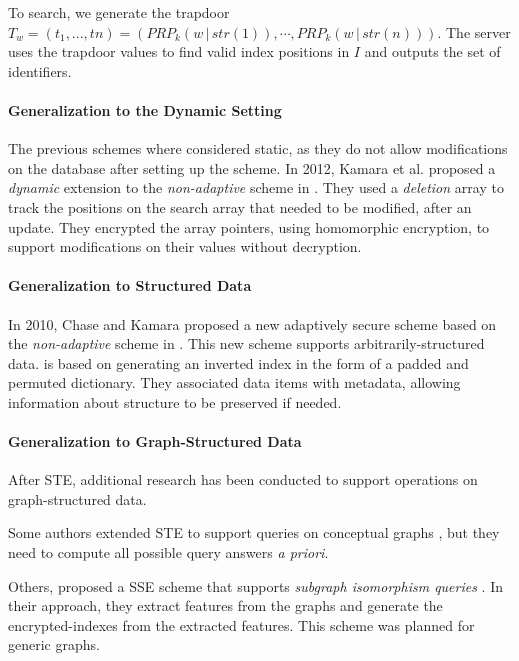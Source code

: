 To search, we generate the trapdoor $T_{w}= (t_{1},...,t{n}) = (PRP_{k}(w \, | \, str(1)),\cdots,PRP_{k}(w \, | \, str(n)))$. The server uses the trapdoor values to find valid index positions in $I$ and outputs the set of identifiers.

\paragraph{Generalization to the Dynamic Setting} The previous schemes where considered static, as they do not allow modifications on the database after setting up the scheme. In 2012, Kamara et al. \autocite{Kamara2012-lm} proposed a \emph{dynamic} extension to the \emph{non-adaptive} scheme in \autocite{Curtmola2011-hi}. They used a \emph{deletion} array to track the positions on the search array that needed to be modified, after an update. They encrypted the array pointers, using homomorphic encryption, to support modifications on their values without decryption.

\paragraph{Generalization to Structured Data} In 2010, Chase and Kamara \autocite{Chase2010-xx} proposed a new adaptively secure scheme based on the \emph{non-adaptive} scheme in \autocite{Curtmola2011-hi}. This new scheme supports arbitrarily-structured data.  is based on generating an inverted index in the form of a padded and permuted dictionary. They associated data items with metadata, allowing information about structure to be preserved if needed. 

\paragraph{Generalization to Graph-Structured Data}
After \gls{STE}, additional research has been conducted to support operations on graph-structured data. 

Some authors extended \gls{STE} to support queries on conceptual graphs \autocite{Poh2012-qs}, but they need to compute all possible query answers \emph{a priori}. 

Others, proposed a \gls{SSE} scheme that supports \emph{subgraph isomorphism queries} \autocite{Cao2011-is}. In their approach, they extract features from the graphs and generate the encrypted-indexes from the extracted features. This scheme was planned for generic graphs.

